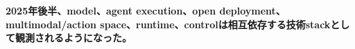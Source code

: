 \noindent\textbf{2025年後半、model、agent execution、open deployment、multimodal/action space、runtime、controlは相互依存する技術stackとして観測されるようになった。}\autocite{src-05738f6c55b7,src-7a7213b68631,src-964121647555,src-aec54e92a7f3,src-b074ccdb2d9e}
